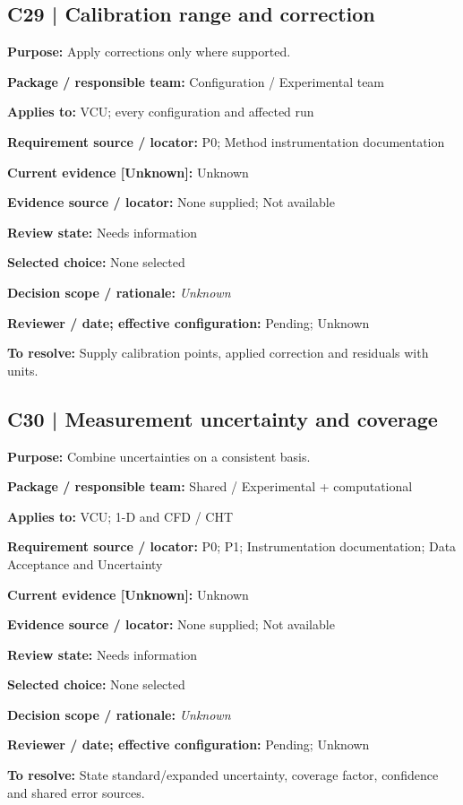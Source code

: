 \documentclass[11pt]{article}
\begin{document}
\begin{minipage}{\textwidth}\small\setlength{\parskip}{2pt}
\subsection*{C29 | Calibration range and correction}
\textbf{Purpose:} Apply corrections only where supported.\par
\textbf{Package / responsible team:} Configuration / Experimental team\par
\textbf{Applies to:} VCU; every configuration and affected run\par
\textbf{Requirement source / locator:} P0; Method instrumentation documentation\par
\textbf{Current evidence [Unknown]:} Unknown\par
\textbf{Evidence source / locator:} None supplied; Not available\par
\textbf{Review state:} Needs information\par
\textbf{Selected choice:} None selected\par
\textbf{Decision scope / rationale:} \textit{Unknown}\par
\textbf{Reviewer / date; effective configuration:} Pending; Unknown\par
\textbf{To resolve:} Supply calibration points, applied correction and residuals with units.\par
\end{minipage}\par\vspace{5pt}
\begin{minipage}{\textwidth}\small\setlength{\parskip}{2pt}
\subsection*{C30 | Measurement uncertainty and coverage}
\textbf{Purpose:} Combine uncertainties on a consistent basis.\par
\textbf{Package / responsible team:} Shared / Experimental + computational\par
\textbf{Applies to:} VCU; 1-D and CFD / CHT\par
\textbf{Requirement source / locator:} P0; P1; Instrumentation documentation; Data Acceptance and Uncertainty\par
\textbf{Current evidence [Unknown]:} Unknown\par
\textbf{Evidence source / locator:} None supplied; Not available\par
\textbf{Review state:} Needs information\par
\textbf{Selected choice:} None selected\par
\textbf{Decision scope / rationale:} \textit{Unknown}\par
\textbf{Reviewer / date; effective configuration:} Pending; Unknown\par
\textbf{To resolve:} State standard/expanded uncertainty, coverage factor, confidence and shared error sources.\par
\end{minipage}\par\vspace{5pt}
\end{document}
